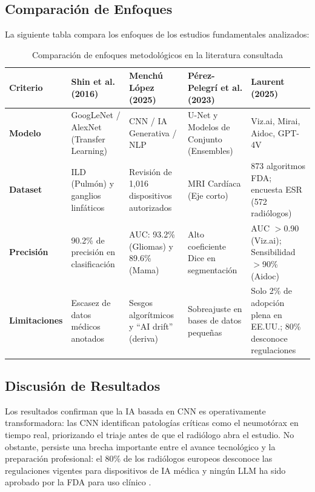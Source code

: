\subsection{Comparación de Enfoques}

La siguiente tabla compara los enfoques de los estudios fundamentales analizados:

\begin{table}[ht]
\centering
\caption{Comparación de enfoques metodológicos en la literatura consultada}
\label{tab:comparacion}
\begin{tabularx}{\textwidth}{@{}lXXXX@{}}
\toprule
\textbf{Criterio} & \textbf{Shin et al. (2016)} & \textbf{Menchú López (2025)} & \textbf{Pérez-Pelegrí et al. (2023)} & \textbf{Laurent (2025)} \\
\midrule
\textbf{Modelo} & GoogLeNet / AlexNet (Transfer Learning) & CNN / IA Generativa / NLP & U-Net y Modelos de Conjunto (Ensembles) & Viz.ai, Mirai, Aidoc, GPT-4V \\
\textbf{Dataset} & ILD (Pulmón) y ganglios linfáticos & Revisión de 1,016 dispositivos autorizados & MRI Cardíaca (Eje corto) & 873 algoritmos FDA; encuesta ESR (572 radiólogos) \\
\textbf{Precisión} & 90.2\% de precisión en clasificación & AUC: 93.2\% (Gliomas) y 89.6\% (Mama) & Alto coeficiente Dice en segmentación & AUC $>$0.90 (Viz.ai); Sensibilidad $>$90\% (Aidoc) \\
\textbf{Limitaciones} & Escasez de datos médicos anotados & Sesgos algorítmicos y \enquote{AI drift} (deriva) & Sobreajuste en bases de datos pequeñas & Solo 2\% de adopción plena en EE.UU.; 80\% desconoce regulaciones \\
\bottomrule
\end{tabularx}
\end{table}

\subsection{Discusión de Resultados}

Los resultados confirman que la IA basada en CNN es operativamente transformadora: las CNN identifican patologías críticas como el neumotórax en tiempo real, priorizando el triaje antes de que el radiólogo abra el estudio. No obstante, persiste una brecha importante entre el avance tecnológico y la preparación profesional: el 80\% de los radiólogos europeos desconoce las regulaciones vigentes para dispositivos de IA médica y ningún LLM ha sido aprobado por la FDA para uso clínico \parencite{Laurent2025}.
